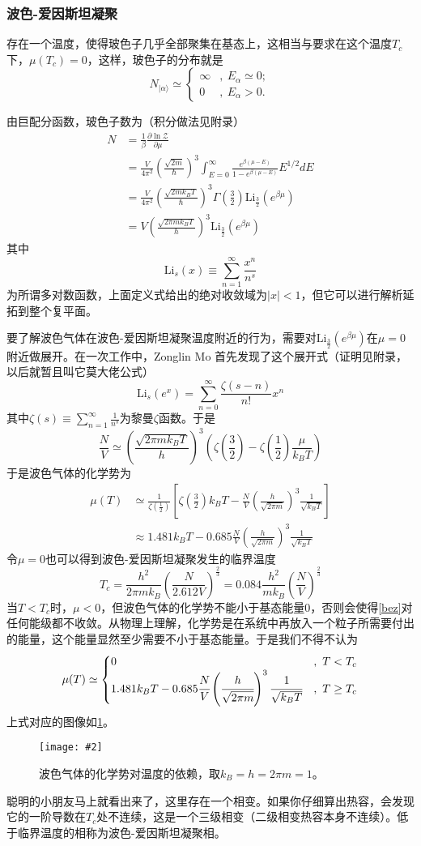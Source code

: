 \documentclass[a4paper,11pt]{ctexart}
\newcommand{\beq}{\begin{equation}}
\newcommand{\eeq}{\end{equation}}
\newcommand{\bea}{\begin{equation}\begin{aligned}}
\newcommand{\eea}{\end{aligned}\end{equation}}
\newcommand{\red}{\color{red}}
\newcommand{\grandz}{\mathcal{Z}}
\newcommand{\Li}[1]{\mathrm{Li}_{#1}}
\newcommand{\cpic}[2]{
\begin{center}
\texttt{[image: \#2]}
\end{center}
}
\newcommand{\cpicn}[3]
{
\begin{figure}[H]
\cpic{#1}{#2}
\caption{#3\label{#2}}
\end{figure}
}
\begin{document}
\subsubsection{波色-爱因斯坦凝聚}
存在一个温度，使得玻色子几乎全部聚集在基态上，这相当与要求在这个温度$T_c$下，$\mu(T_c) = 0$，这样，玻色子的分布就是
\beq
N_{|\alpha \rangle} \simeq \begin{cases} \infty &,\ E_\alpha \simeq 0; \\ 0&,\ E_\alpha > 0. 
\end{cases}
\eeq
\par
由巨配分函数，玻色子数为（积分做法见附录）
\bea
N &= \frac{1}{\beta} \frac{\partial \ln \grandz}{\partial \mu}\\
&= \frac{V}{4\pi^2} \left(\frac{\sqrt{2m}}{\hbar}\right)^3 \int_{E=0}^\infty \frac{e^{\beta (\mu - E)}}{1 - e^{\beta (\mu - E)}} E^{1/2} dE \\
&= \frac{V}{4\pi^2} \left(\frac{\sqrt{2mk_B T}}{\hbar} \right)^3 \Gamma \left(\frac{3}{2}\right) \Li{\frac{3}{2}} (e^{\beta \mu}) \\
&= V \left(\frac{\sqrt{2\pi m k_B T}}{h}\right)^3 \Li{\frac{3}{2}} (e^{\beta \mu})
\eea
其中
\beq
\Li{s}(x) \equiv \sum_{n=1}^\infty \frac{x^n}{n^s}
\eeq
为所谓多对数函数，上面定义式给出的绝对收敛域为$|x|<1$，但它可以进行解析延拓到整个复平面。\par
要了解波色气体在波色-爱因斯坦凝聚温度附近的行为，需要对$\Li{\frac{3}{2}} (e^{\beta \mu})$在$\mu = 0$附近做展开。{\red 在一次工作中，Zonglin Mo 首先发现了这个展开式}（证明见附录，以后就暂且叫它莫大佬公式）
\beq
\Li{s} (e^x) = \sum_{n=0}^\infty \frac{\zeta(s-n)}{n!} x^n
\eeq
其中$\zeta(s) \equiv \sum_{n=1}^\infty \frac{1}{n^s}$为黎曼$\zeta$函数。于是
\beq
\frac{N}{V} \simeq \left(\frac{\sqrt{2\pi m k_B T}}{h}\right)^3 \left( \zeta \left(\frac{3}{2}\right) -\zeta \left(\frac{1}{2}\right) \frac{\mu}{k_B T}\right)
\eeq
于是波色气体的化学势为
\bea
\mu(T) &\simeq  \frac{1}{\zeta \left(\frac{1}{2}\right)} \left[ \zeta \left(\frac{3}{2}\right) k_B T - \frac{N}{V} \left( \frac{h}{\sqrt{2\pi m}}\right)^3 \frac{1}{\sqrt{k_B T}} \right] \\
&\approx 1.481 k_B T - 0.685 \frac{N}{V} \left( \frac{h}{\sqrt{2\pi m}}\right)^3 \frac{1}{\sqrt{k_B T}}
\eea
令$\mu = 0$也可以得到波色-爱因斯坦凝聚发生的临界温度
\beq
T_c = \frac{h^2}{2\pi m k_B} \left( \frac{N}{2.612V} \right)^{\frac{2}{3}} = 0.084 \frac{h^2}{mk_B} \left( \frac{N}{V}\right)^{\frac{2}{3}}
\eeq
当$T<T_c$时，$\mu <0$，但波色气体的化学势不能小于基态能量0，否则会使得\cref{bez}对任何能级都不收敛。从物理上理解，化学势是在系统中再放入一个粒子所需要付出的能量，这个能量显然至少需要不小于基态能量。于是我们不得不认为
\beq
\mu(T) \simeq \begin{cases} 0 &,\ T<T_c \\
1.481 k_B T - 0.685 \cfrac{N}{V} \left( \cfrac{h}{\sqrt{2\pi m}}\right)^3 \cfrac{1}{\sqrt{k_B T}}&,\ T\geq T_c
\end{cases}
\eeq
上式对应的图像如\cref{bec_mu}。
\cpicn{0.45}{bec_mu}{波色气体的化学势对温度的依赖，取$k_B = h = 2\pi m = 1$。}
聪明的小朋友马上就看出来了，这里存在一个相变。如果你仔细算出热容，会发现它的一阶导数在$T_c$处不连续，这是一个三级相变（二级相变热容本身不连续）。低于临界温度的相称为{\red 波色-爱因斯坦凝聚相}。
\end{document}
